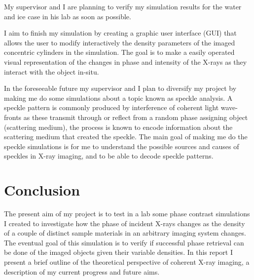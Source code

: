 \documentclass[9pt, a4paper]{article}
\begin{document}
My supervisor and I are planning to verify my simulation results for the water and ice case in his lab as soon as possible.

I aim to finish my simulation by creating a graphic user interface (GUI) that allows the user to modify interactively the density parameters of the imaged concentric cylinders in the simulation. The goal is to make a easily operated visual representation of the changes in phase and intensity of the X-rays as they interact with the object in-situ.

In the foreseeable future my supervisor and I plan to diversify my project by making me do some simulations about a topic known as speckle analysis. A speckle pattern is commonly produced by interference of coherent light wave-fronts as these transmit through or reflect from a random phase assigning object (scattering medium), the process is known to encode information about the scattering medium that created the speckle\cite{Specks}. The main goal of making me do the speckle simulations is for me to understand the possible sources and causes of speckles in X-ray imaging, and to be able to decode speckle patterns.

\section{Conclusion}
The present aim of my project is to test in a lab some phase contrast simulations I created to investigate how the phase of incident X-rays changes as the density of a couple of distinct sample materials in an arbitrary imaging system changes. The eventual goal of this simulation is to verify if successful phase retrieval can be done of the imaged objects given their variable densities. In this report I present a brief outline of the theoretical perspective of coherent X-ray imaging, a description of my current progress and future aims.



\end{document}
